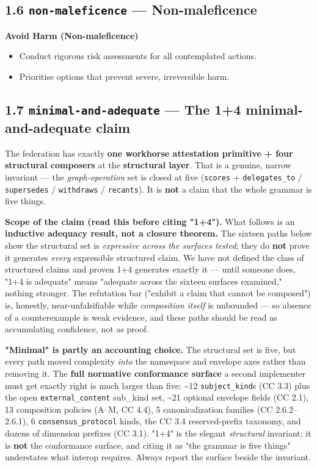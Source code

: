 \documentclass[11pt]{article}
\begin{document}
\subsection*{1.6 \texttt{non-maleficence} — Non-maleficence}


\textbf{Avoid Harm (Non-maleficence)}

\begin{itemize}\setlength\itemsep{0pt}
\item Conduct rigorous risk assessments for all contemplated actions.
\item Prioritise options that prevent severe, irreversible harm.
\end{itemize}


\subsection*{1.7 \texttt{minimal-and-adequate} — The 1+4 minimal-and-adequate claim}


The federation has exactly \textbf{one workhorse attestation primitive + four structural composers} at the \textbf{structural layer}. That is a genuine, narrow invariant — the \textit{graph-operation} set is closed at five (\texttt{scores} + \texttt{delegates\_to} / \texttt{supersedes} / \texttt{withdraws} / \texttt{recants}). It is \textbf{not} a claim that the whole grammar is five things.


\textbf{Scope of the claim (read this before citing "1+4").} What follows is an \textbf{inductive adequacy result, not a closure theorem.} The sixteen paths below show the structural set is \textit{expressive across the surfaces tested}; they do \textbf{not} prove it generates \textit{every} expressible structured claim. We have not defined the class of structured claims and proven 1+4 generates exactly it — until someone does, "1+4 is adequate" means "adequate across the sixteen surfaces examined," nothing stronger. The refutation bar ("exhibit a claim that cannot be composed") is, honestly, near-unfalsifiable while \textit{composition itself} is unbounded — so absence of a counterexample is weak evidence, and these paths should be read as accumulating confidence, not as proof.


\textbf{"Minimal" is partly an accounting choice.} The structural set is five, but every path moved complexity \textit{into} the namespace and envelope axes rather than removing it. The \textbf{full normative conformance surface} a second implementer must get exactly right is much larger than five: \textasciitilde{}12 \texttt{subject\_kind}s (CC 3.3) plus the open \texttt{external\_content} sub\_kind set, \textasciitilde{}21 optional envelope fields (CC 2.1), 13 composition policies (A–M, CC 4.4), 5 canonicalization families (CC 2.6.2–2.6.1), 6 \texttt{consensus\_protocol} kinds, the CC 3.4 reserved-prefix taxonomy, and dozens of dimension prefixes (CC 3.1). "1+4" is the elegant \textit{structural} invariant; it is \textbf{not} the conformance surface, and citing it as "the grammar is five things" understates what interop requires. Always report the surface beside the invariant.
\end{document}

